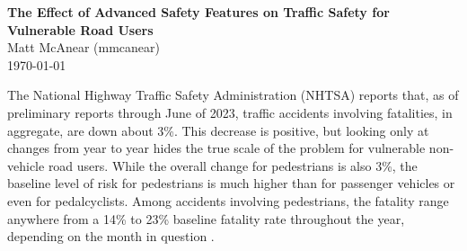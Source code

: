 \documentclass[12pt]{article}
\begin{document}
\begin{flushleft}
\textbf{The Effect of Advanced Safety Features on Traffic Safety for Vulnerable Road Users} \\
Matt McAnear (mmcanear) \\
\today
\end{flushleft}

\vspace{0.1in}

\normalsize

The National Highway Traffic Safety Administration (NHTSA) reports that, as of preliminary reports through
June of 2023, traffic accidents involving fatalities, in aggregate, are down about 3\%. This decrease is positive,
but looking only at changes from year to year hides the true scale of the problem for vulnerable non-vehicle
road users. While the overall change for pedestrians is also 3\%, the baseline level of risk for pedestrians is
much higher than for passenger vehicles or even for pedalcyclists. Among accidents involving pedestrians, the fatality
range anywhere from a 14\% to 23\% baseline fatality rate throughout the year, depending on the month in
question \cite{national_highway_traffic_safety_administration_early_2024}.
\end{document}
